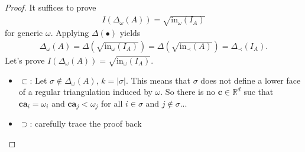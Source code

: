 \documentclass[a4paper, 11pt]{article}
\begin{document}
\begin{proof}
It suffices to prove 
\begin{align*}
  I(\Delta_\omega(A)) = \sqrt{\mathrm{in}_\omega(I_A)}
\end{align*}
for generic \( \omega \). Applying \( \Delta(\bullet) \) yields 
\begin{align*}
  \Delta_\omega(A) = \Delta(\sqrt{\mathrm{in}_\omega(I_A)}) = \Delta(\sqrt{\mathrm{in}_\prec(A)}) = \Delta_\prec(I_A).
\end{align*}
Let's prove \(   I(\Delta_\omega(A)) = \sqrt{\mathrm{in}_\omega(I_A)}\).

\begin{itemize}
  \item \( \subset \): Let \( \sigma \notin \Delta_\omega(A) \), \( k = |\sigma| \). This means that \( \sigma \) does not define a lower face of a regular triangulation induced by \( \omega \). So there is no \( \mathbf c \in \mathbb R^d \) suc that \( \mathbf c \mathbf a_i = \omega_i \) and \( \mathbf c \mathbf a_j < \omega_j \) for all \( i \in \sigma \) and \( j \notin \sigma \)...
  \item \( \supset \): carefully trace the proof back 
\end{itemize}
\end{proof}

\end{document}
